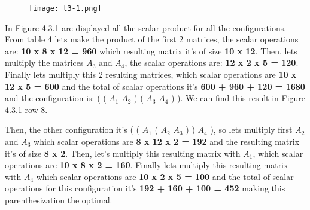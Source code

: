 \begin{figure}[H]
\texttt{[image: t3-1.png]}
\centering \linebreak {}
\end{figure} \hfill \break

In Figure 4.3.1 are displayed all the scalar product for all the configurations. From table 4 lets make the product of the first 2 matrices, the scalar operations are: {\bfseries 10 x 8 x 12 = 960} which resulting matrix it's of size {\bfseries 10 x 12}. Then, lets multiply the matrices $A_{3}$ and $A_{4}$, the scalar operations are: {\bfseries 12 x 2 x 5 = 120}. Finally lets multiply this 2 resulting matrices, which scalar operations are {\bfseries 10 x 12 x 5 = 600} and the total of scalar operations it's {\bfseries 600 + 960 + 120 = 1680} and the configuration is: ( ( $A_{1}$ $A_{2}$ ) ( $A_{3}$ $A_{4}$ ) ). We can find this result in Figure 4.3.1 row 8. \hfill \break

Then, the other configuration it's ( ( $A_{1}$ ( $A_{2}$ $A_{3}$ ) ) $A_{4}$ ), so lets multiply first $A_{2}$ and $A_{3}$ which scalar operations are {\bfseries 8 x 12 x 2 = 192} and the resulting matrix it's of size {\bfseries 8 x 2}. Then, let's multiply this resulting matrix with $A_{1}$, which scalar operations are {\bfseries 10 x 8 x 2 = 160}. Finally lets multiply this resulting matrix with $A_{4}$ which scalar operations are {\bfseries 10 x 2 x 5 = 100} and the total of scalar operations for this configuration it's {\bfseries 192 + 160 + 100 = 452} making this parenthesization the optimal.

\pagebreak
\pagebreak